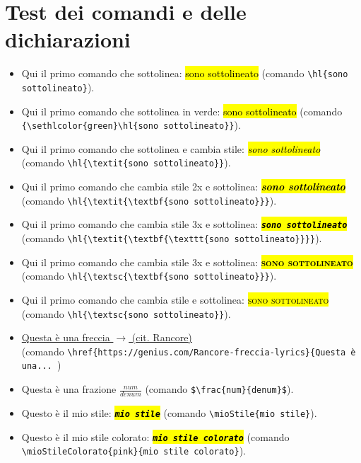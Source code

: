 \documentclass{article}
\newcommand{\mioStile}[1] {
    \hl{\textit{\textbf{\texttt{#1}}}}
}
\newcommand{\mioStileColorato}[2] {
    {\sethlcolor{#1}\mioStile{#2}}
}
\begin{document}
        \section{Test dei comandi e delle dichiarazioni}
            \begin{itemize}
                \item Qui il primo comando che sottolinea: \hl{sono sottolineato} (comando \verb!\hl{sono sottolineato}!).
                \item Qui il primo comando che sottolinea in verde: {\hl{sono sottolineato}} (comando \verb!{\sethlcolor{green}\hl{sono sottolineato}}!). %
                \item Qui il primo comando che sottolinea e cambia stile: \hl{\textit{sono sottolineato}} (comando \verb!\hl{\textit{sono sottolineato}}!).
                \item Qui il primo comando che cambia stile 2x e sottolinea: \hl{\textit{\textbf{sono sottolineato}}} (comando \verb!\hl{\textit{\textbf{sono sottolineato}}}!).
                \item Qui il primo comando che cambia stile 3x e sottolinea: \hl{\textit{\textbf{\texttt{sono sottolineato}}}} (comando \verb!\hl{\textit{\textbf{\texttt{sono sottolineato}}}}!).
                \item Qui il primo comando che cambia stile 3x e sottolinea: \hl{\textsc{\textbf{sono sottolineato}}} (comando \verb!\hl{\textsc{\textbf{sono sottolineato}}}!).
                \item Qui il primo comando che cambia stile e sottolinea: \hl{\textsc{sono sottolineato}} (comando \verb!\hl{\textsc{sono sottolineato}}!).
                \item \href{https://genius.com/Rancore-freccia-lyrics}{Questa è una freccia $\rightarrow$ (cit. Rancore)} \\
                    (comando \verb!\href{https://genius.com/Rancore-freccia-lyrics}{Questa è una... !)      
                \item Questa è una frazione $\frac{num}{denum}$ (comando \verb!$\frac{num}{denum}$!).
                \item Questo è il mio stile: \mioStile{mio stile} (comando \verb!\mioStile{mio stile}!).
                \item Questo è il mio stile colorato: \mioStileColorato{pink}{mio stile colorato} (comando \verb!\mioStileColorato{pink}{mio stile colorato}!). 
            \end{itemize}
\end{document}
